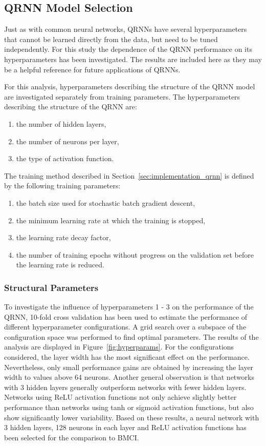 \documentclass[journal abbreviation, manuscript]{copernicus}
\begin{document}
\subsection{QRNN Model Selection}

Just as with common neural networks, QRNNs have several hyperparameters that cannot
be learned directly from the data, but need to be tuned independently. For this
study the dependence of the QRNN performance on its hyperparameters has been
investigated. The results are included here as they may be a helpful reference
for future applications of QRNNs.

For this analysis, hyperparameters describing the structure of the QRNN model
are investigated separately from training parameters. The hyperparameters
describing the structure of the QRNN are:
\begin{enumerate}
  \item the number of hidden layers,
  \item the number of neurons per layer,
  \item the type of activation function.
  \setcounter{enumic}{\value{enumi}}
\end{enumerate}
The training method  described in Section~\ref{sec:implementation_qrnn} is
defined by the following training parameters:
\begin{enumerate}
  \setcounter{enumi}{\value{enumic}}
  \item the batch size used for stochastic batch gradient descent,
  \item the minimum learning rate at which the training is stopped,
  \item the learning rate decay factor,
  \item the number of training epochs without progress on the validation set
     before the learning rate is reduced.
\end{enumerate}

\subsubsection{Structural Parameters}

  To investigate the influence of hyperparameters 1 - 3 on the performance of
the QRNN, 10-fold cross validation has been used to estimate the performance of
different hyperparameter configurations. A grid search over a subspace of the
configuration space was performed to find optimal parameters. The
results of the analysis are displayed in Figure~\ref{fig:hyperparams}. For the
configurations considered, the layer width has the most significant effect on
the performance. Nevertheless, only small performance gains are obtained by
increasing the layer width to values above 64 neurons. Another general observation is that
networks with 3 hidden layers generally outperform networks with fewer hidden
layers. Networks using ReLU activation functions not only achieve slightly better
performance than networks using tanh or sigmoid activation functions, but also
show significantly lower variability. Based on these results, a neural network
with 3 hidden layers, 128 neurons in each layer and ReLU activation functions
 has been selected for the comparison to BMCI.
\end{document}
